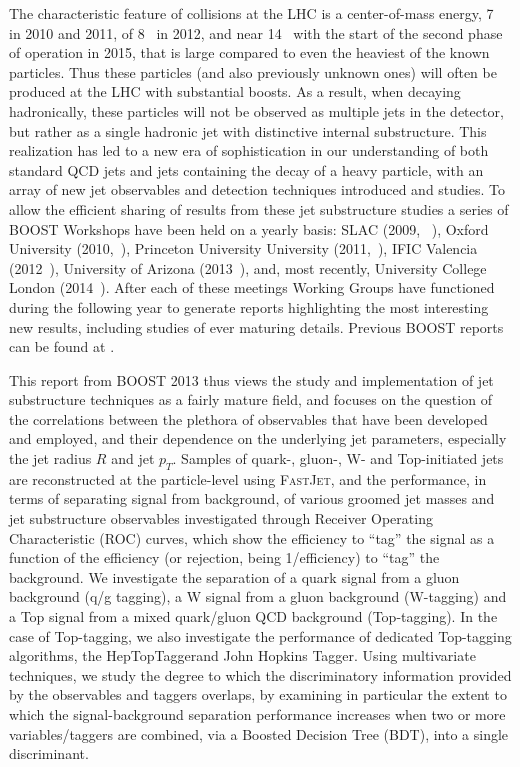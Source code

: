 The characteristic feature of collisions at the LHC is a center-of-mass energy, 7~\tev{} in 2010 and 2011, 
of 8~\tev{} in 2012, and near 14~\tev{} with the start of the second phase of operation in 2015, that is large
compared to even the heaviest of the known particles.  Thus these particles (and also previously unknown ones)
will often be produced at the LHC with
substantial boosts.  As a result, when decaying hadronically, these particles will not be observed as multiple jets in the detector, but rather
as a single hadronic jet with distinctive internal substructure.  This realization has led to a new era of sophistication
in our understanding of  both standard QCD jets and jets containing the decay of a heavy particle, with an array
of new jet observables and detection techniques introduced and studies.  To allow the efficient sharing of 
results from these jet substructure studies a series of BOOST Workshops have been held on a yearly basis:
SLAC (2009, ~\cite{boost09}), 
Oxford University (2010,~\cite{boost10}), Princeton 
University University (2011,~\cite{boost11}),  IFIC Valencia (2012~\cite{boost12}), 
University of Arizona (2013~\cite{boost13}), and, most recently, University College London (2014~\cite{boost2014}).
After each of these meetings Working Groups have functioned during the following year to generate reports
highlighting the most interesting new results, including studies of ever maturing details.   Previous BOOST reports
can be found at \cite{Abdesselam:2010pt,Altheimer:2012mn,Altheimer:2013yza}.

This report from BOOST 2013 thus views the study and implementation of jet substructure techniques as a fairly
mature field, and focuses on the question of the correlations between the plethora of observables that have been developed 
and employed, and their dependence on the underlying jet parameters, especially the jet radius $R$ and jet $p_T$. Samples of quark-, gluon-, W- and Top-initiated jets are reconstructed at the particle-level using \textsc{FastJet}, and the performance, in terms of separating signal from background, of various groomed jet masses and jet substructure observables investigated through Receiver Operating Characteristic (ROC) curves, which show the efficiency to ``tag'' the signal as a function of the efficiency (or rejection, being 1/efficiency) to ``tag'' the background. We investigate the separation of a quark signal from a gluon background (q/g tagging), a W signal from a gluon background (W-tagging) and a Top signal from a mixed quark/gluon QCD background (Top-tagging). In the case of Top-tagging, we also investigate the performance of dedicated Top-tagging algorithms, the HepTopTagger and John Hopkins Tagger. Using multivariate techniques, we study the degree to which the discriminatory information provided by the observables and taggers overlaps, by examining in particular the extent to which the signal-background separation performance increases when two or more variables/taggers are combined, via a Boosted Decision Tree (BDT), into a single discriminant. 

